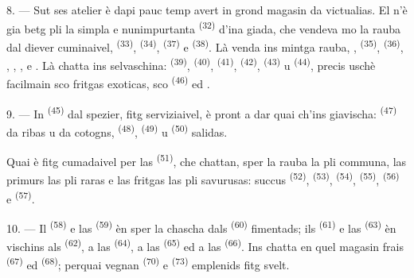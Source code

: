 \VUsaut{4.0mm}
\VUsaut{3.0mm}

8. --- Sut ses atelier è dapi pauc temp avert in grond magasin da victualias. El
n'è gia betg pli la simpla e nunimpurtanta  \textsuperscript{(32)} d'ina
giada,
che vendeva mo la rauba dal diever cuminaivel,  \textsuperscript{(33)},
 \textsuperscript{(34)},  \textsuperscript{(37)} e
 \textsuperscript{(38)}. Là venda ins mintga rauba, ,
 \textsuperscript{(35)},  \textsuperscript{(36)}, ,
, ,  e . Là chatta ins
selvaschina:  \textsuperscript{(39)},  \textsuperscript{(40)},
 \textsuperscript{(41)},  \textsuperscript{(42)},  \textsuperscript{(43)} u  \textsuperscript{(44)}, precis uschè
facilmain sco
fritgas exoticas, sco  \textsuperscript{(46)} ed .

9. --- In  \textsuperscript{(45)} dal spezier, fitg serviziaivel, è pront a dar
quai ch'ins giavischa:  \textsuperscript{(47)} da ribas u da cotogns,
 \textsuperscript{(48)},  \textsuperscript{(49)} u
\textsuperscript{(50)} salidas.

Quai è fitg cumadaivel per las  \textsuperscript{(51)}, che chattan, sper la
rauba la pli communa, las primurs las pli raras e las fritgas las pli savurusas:
succus  \textsuperscript{(52)},  \textsuperscript{(53)},
\textsuperscript{(54)},  \textsuperscript{(55)}, 
\textsuperscript{(56)} e  \textsuperscript{(57)}.

\VUsaut{4.0mm}
\VUsaut{3.0mm}

10. --- Il  \textsuperscript{(58)} e las  \textsuperscript{(59)}
èn sper
la chascha dals  \textsuperscript{(60)} fimentads; ils 
\textsuperscript{(61)} e las  \textsuperscript{(63)} èn vischins als
\textsuperscript{(62)}, a las  \textsuperscript{(64)}, a las  \textsuperscript{(65)} ed a las  \textsuperscript{(66)}. Ins chatta
en
quel magasin frais  \textsuperscript{(67)} ed
 \textsuperscript{(68)};
perquai vegnan  \textsuperscript{(70)} e 
\textsuperscript{(73)} emplenids fitg svelt.

